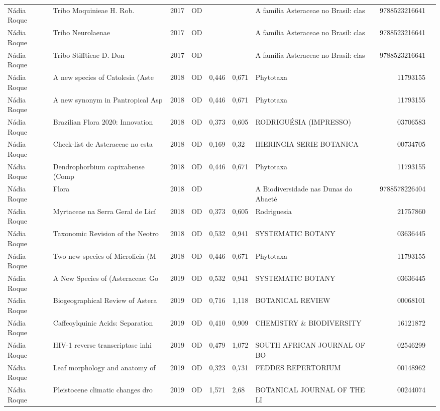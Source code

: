 \documentclass[12pt,brazil]{article}\usepackage[]{graphicx}\usepackage[]{xcolor}
\begin{document}
\begin{longtable}{lllrrllrr}
Nádia Roque & Tribo Moquinieae H. Rob. & 2017 & OD &  &  & A família Asteraceae no Brasil: clas & 9788523216641 \\
Nádia Roque & Tribo Neurolaenae & 2017 & OD &  &  & A família Asteraceae no Brasil: clas & 9788523216641 \\
Nádia Roque & Tribo Stifftieae D. Don & 2017 & OD &  &  & A família Asteraceae no Brasil: clas & 9788523216641 \\
Nádia Roque & A new species of Catolesia (Aste & 2018 & OD & 0,446 & 0,671 & Phytotaxa & 11793155 \\
Nádia Roque & A new synonym in Pantropical Asp & 2018 & OD & 0,446 & 0,671 & Phytotaxa & 11793155 \\
Nádia Roque & Brazilian Flora 2020: Innovation & 2018 & OD & 0,373 & 0,605 & RODRIGUÉSIA (IMPRESSO) & 03706583 \\
Nádia Roque & Check-list de Asteraceae no esta & 2018 & OD & 0,169 & 0,32 & IHERINGIA SERIE BOTANICA & 00734705 \\
Nádia Roque & Dendrophorbium capixabense (Comp & 2018 & OD & 0,446 & 0,671 & Phytotaxa & 11793155 \\
Nádia Roque & Flora & 2018 & OD &  &  & A Biodiversidade nas Dunas do Abaeté & 9788578226404 \\
Nádia Roque & Myrtaceae na Serra Geral de Licí & 2018 & OD & 0,373 & 0,605 & Rodriguesia & 21757860 \\
Nádia Roque & Taxonomic Revision of the Neotro & 2018 & OD & 0,532 & 0,941 & SYSTEMATIC BOTANY & 03636445 \\
Nádia Roque & Two new species of Microlicia (M & 2018 & OD & 0,446 & 0,671 & Phytotaxa & 11793155 \\
Nádia Roque & A New Species of (Asteraceae: Go & 2019 & OD & 0,532 & 0,941 & SYSTEMATIC BOTANY & 03636445 \\
Nádia Roque & Biogeographical Review of Astera & 2019 & OD & 0,716 & 1,118 & BOTANICAL REVIEW & 00068101 \\
Nádia Roque & Caffeoylquinic Acids: Separation & 2019 & OD & 0,410 & 0,909 & CHEMISTRY \& BIODIVERSITY & 16121872 \\
Nádia Roque & HIV-1 reverse transcriptase inhi & 2019 & OD & 0,479 & 1,072 & SOUTH AFRICAN JOURNAL OF BO & 02546299 \\
Nádia Roque & Leaf morphology and anatomy of   & 2019 & OD & 0,323 & 0,731 & FEDDES REPERTORIUM & 00148962 \\
\rowcolor{coautr}\rowcolor{coautr}\rowcolor{coautr}\rowcolor{coautr}\rowcolor{coautr}\rowcolor{coautr}\rowcolor{coautr}\rowcolor{coautr}\rowcolor{coautr}\rowcolor{coautr}\rowcolor{coautr}\rowcolor{coautr}\rowcolor{coautr}\rowcolor{coautr}\rowcolor{coautr}\rowcolor{coautr}Nádia Roque & Pleistocene climatic changes dro & 2019 & OD & 1,571 & 2,68 & BOTANICAL JOURNAL OF THE LI & 00244074 \\

\end{longtable}
\end{document}
